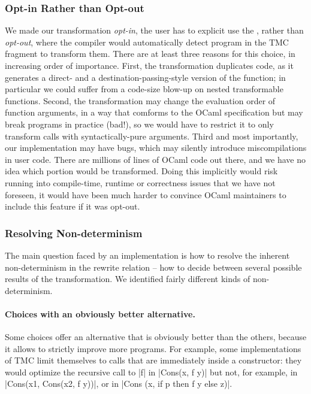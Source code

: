 \subsubsection{Opt-in Rather than Opt-out}\label{subsec:optin}
We made our transformation \emph{opt-in}, the user has to explicit use
the , rather than \emph{opt-out}, where the
compiler would automatically detect program in the TMC fragment to
transform them. There are at least three reasons for this choice, in
increasing order of importance. First, the transformation duplicates
code, as it generates a direct- and a destination-passing-style
version of the function; in particular we could suffer from
a code-size blow-up on nested transformable functions. Second, the
transformation may change the evaluation order of function arguments,
in a way that comforms to the OCaml specification but may break
programs in practice (bad!), so we would have to restrict it to only
transform calls with syntactically-pure arguments. Third and most
importantly, our implementation may have bugs, which may silently
introduce miscompilations in user code. There are millions of lines of
OCaml code out there, and we have no idea which portion would be
transformed. Doing this implicitly would risk running into
compile-time, runtime or correctness issues that we have not foreseen,
it would have been much harder to convince OCaml maintainers to
include this feature if it was opt-out.

\subsubsection{Resolving Non-determinism}

The main question faced by an implementation is how to resolve the
inherent non-determinism in the rewrite relation -- how to decide
between several possible results of the transformation. We identified
fairly different kinds of non-determinism.

\paragraph{Choices with an obviously better alternative.}
Some choices offer an alternative that is obviously better than the others, because it allows to strictly improve more programs. For example, some implementations of TMC limit themselves to calls that are immediately inside a constructor: they would optimize the recursive call to \ocaml|f| in \ocaml|Cons(x, f y)| but not, for example, in \ocaml|Cons(x1, Cons(x2, f y))|, or in \ocaml|Cons (x, if p then f y else z)|.

